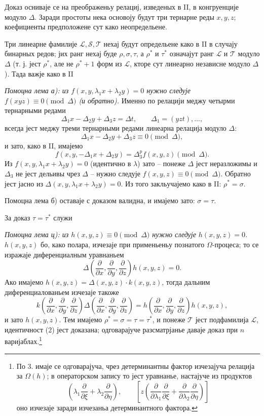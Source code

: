 \documentclass[11pt]{article}
\begin{document}
Доказ осниваје се на преображеньу релациј, изведеных в II, в конгруенције модуло $\Delta$. Заради простоты нека основоју будут три тернарне реды $x,y,z$; коефициенты предположене сут како неопредельене.

Три линеарне фамилије $\mathcal L,\mathcal S,\mathcal T$ нехај будут определьене како в II в случају бинарных редов; јих ранг нехај буде $\rho,\sigma,\tau$, а $\rho^*$ и $\tau^*$ означајут ранг $\mathcal L$ и $\mathcal T$ модуло $\Delta$ (т. ј. јест $\rho^*$, але не $\rho^*+1$ форм из $\mathcal L$, кторе сут линеарно независне модуло $\Delta$). Тада важје како в II

{\itshape Помоцна лема а): из $f(x,y,\lambda_1x+\lambda_2y)=0$ нужно следује $f(xyz)\equiv0\pmod{\Delta}$ (и обратно).} Именно по релацији меджу четырми тернарными редами
\[
  \Delta_1x-\Delta_2y+\Delta_3z=\Delta t,
  \qquad \Delta_1=(yzt),\ldots,
\]
всегда јест меджу треми тернарными редами линеарна релација модуло $\Delta$:
\[
  \Delta_1x-\Delta_2y+\Delta_3z\equiv0\pmod{\Delta},
\]
и зато, како в II, имајемо
\[
  f(x,y,-\Delta_1x+\Delta_2y)=\Delta_3^p f(x,y,z)\pmod{\Delta}.
\]
Из $f(x,y,\lambda_1x+\lambda_2y)=0$ (идентично в $\lambda$) зато -- понеже $\Delta$ јест неразложимы и $\Delta_3$ не јест дельивы чрез $\Delta$ -- нужно следује $f(x,y,z)\equiv0\pmod{\Delta}$. Обратно јест јасно из $\Delta(x,y,\lambda_1x+\lambda_2y)=0$. Из того закльучајемо како в II: $\rho^*=\sigma$.

Помоцна лема б) оставаје с доказом валидна, и имајемо зато: $\sigma=\tau$.

За доказ $\tau=\tau^*$ служи

{\itshape Помоцна лема ц): из $h(x,y,z)\equiv0\pmod{\Delta}$ нужно следује $h(x,y,z)=0$.}
$h(x,y,z)$ бо, како полара, изчезаје при применьеньу познатого $\Omega$-процеса; то се изражаје диференциалным уравнаньем
\[
  \Delta\!\left(\frac{\partial}{\partial x},\frac{\partial}{\partial y},\frac{\partial}{\partial z}\right)h(x,y,z)=0.
\]
Ако имајемо $h(x,y,z)=\Delta(x,y,z)\cdot k(x,y,z)$, тогда дальним диференциалованьем изчезаје такоже
\[
  k\!\left(\frac{\partial}{\partial x},\frac{\partial}{\partial y},\frac{\partial}{\partial z}\right)
  \Delta\!\left(\frac{\partial}{\partial x},\frac{\partial}{\partial y},\frac{\partial}{\partial z}\right)
  =
  h\!\left(\frac{\partial}{\partial x},\frac{\partial}{\partial y},\frac{\partial}{\partial z}\right)h(x,y,z),
\]
и зато $h(x,y,z)$. Тем имајемо $\rho^*=\sigma=\tau=\tau^*$, и понеже $\mathcal T$ јест подфамилија $\mathcal L$, идентичност (2) јест доказана; одговарајуче разсматрјанье даваје доказ при $n$ варијаблах.\footnote{По 3. имаје се одговарајуча, чрез детерминантны фактор изчезајуча релација за $\Omega(h)$; в операторском запису то јест уравнанье, настајуче из продуктов
\[
 \left(\lambda_1\frac{\partial}{\partial \xi}+\lambda_2\frac{\partial}{\partial \eta}\right),
 \qquad
 \left[z\left(\frac{\partial}{\partial\lambda_1}\frac{\partial}{\partial \xi}
 +\frac{\partial}{\partial\lambda_2}\frac{\partial}{\partial \eta}\right)\right]
\]
оно изчезаје заради изчезаньа детерминантного фактора.}
\end{document}
